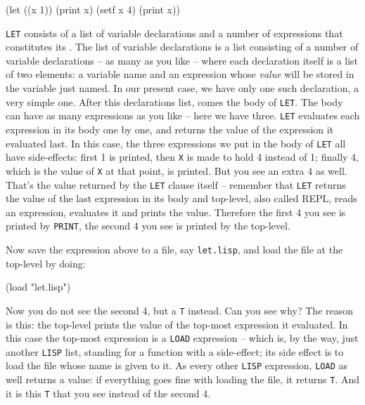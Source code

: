 \documentclass[a4paper,11pt]{article}
\begin{document}
\begin{uenum}
\begin{lispcode}
(let ((x 1)) (print x) (setf x 4) (print x))
\end{lispcode}

\begin{uenumi}

\item \Verb+LET+ consists of a list of variable declarations and a number of expressions that constitutes its . The list of variable declarations is a list consisting of a number of variable declarations -- as many as you like -- where each declaration itself is a list of two elements: a variable name and an expression whose \emph{value} will be stored in the variable just named. In our present case, we have only one such declaration, a very simple one. After this declarations list, comes the body of \Verb+LET+. The body can have as many expressions as you like -- here we have three. \Verb+LET+ evaluates each expression in its body one by one, and returns the value of the expression it evaluated last. In this case, the three expressions we put in the body of \Verb+LET+ all have side-effects: first 1 is printed, then \Verb+X+ is made to hold 4 instead of 1; finally 4, which is the value of \Verb+X+ at that point, is printed. But you see an extra 4 as well. That's the value returned by the \Verb+LET+ clause itself -- remember that \Verb+LET+ returns the value of the last expression in its body and top-level, also called REPL, reads an expression, evaluates it and prints the value. Therefore the first 4 you see is printed by \Verb+PRINT+, the second 4 you see is printed by the top-level.

\item Now save the expression above to a file, say \Verb+let.lisp+, and load the file at the top-level by doing:

\begin{lispcode}
(load "let.lisp")
\end{lispcode}

Now you do not see the second 4, but a \Verb+T+ instead. Can you see why? The reason is this: the top-level prints the value of the top-most expression it evaluated. In this case the top-most expression is a \Verb+LOAD+ expression -- which is, by the way, just another \Verb+LISP+ list, standing for a function with a side-effect; its side effect is to load the file whose name is given to it. As every other \Verb+LISP+ expression, \Verb+LOAD+ as well returns a value: if everything goes fine with loading the file, it returns \Verb+T+. And it is this \Verb+T+ that you see instead of the second 4.


\end{uenumi}
\end{uenum}
\end{document}
